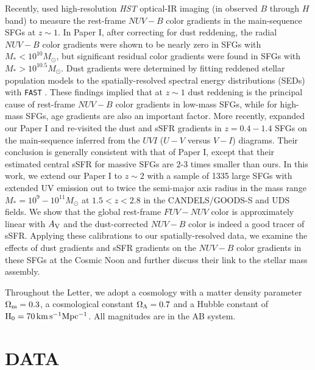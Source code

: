 \documentclass[twocolumn]{aastex61}
\begin{document}
Recently, \citet[][hereafter Paper I]{Liu16} used high-resolution {\it HST} optical-IR 
imaging (in observed $B$ through $H$ band) to measure the rest-frame $NUV-B$ color gradients 
in the main-sequence SFGs at $z\sim1$. In Paper I, after correcting for dust reddening, 
the radial $NUV-B$ color gradients were shown to be nearly zero in SFGs 
with $M_{\ast} < 10^{10}M_{\odot}$, but 
significant residual color gradients were found in SFGs with $M_{\ast} > 10^{10.5}M_{\odot}$. 
Dust gradients were determined by fitting reddened stellar population models to 
the spatially-resolved spectral energy distributions (SEDs) with {\tt FAST} \citep[][]{Kriek+09}.
These findings implied that at $z\sim1$ dust reddening is the principal cause of rest-frame $NUV-B$ 
color gradients in low-mass SFGs, while for high-mass SFGs, 
age gradients are also an important factor. 
More recently, \citet[][]{Wang17} expanded our Paper I and 
re-visited the dust and sSFR gradients in $z=0.4-1.4$ SFGs on the main-sequence 
inferred from the $UVI$ ($U-V$ versus $V-I$) diagrams. Their conclusion is 
generally consistent with that of Paper I, except that their estimated central sSFR for massive SFGs 
are 2-3 times smaller than ours.
%
In this work, we extend our Paper I to $z\sim2$ with a 
sample of 1335 large SFGs with extended UV emission out 
to twice the semi-major axis radius in the mass range $M_{\ast} = 10^{9}-10^{11}M_{\odot}$ 
at $1.5<z<2.8$ in the CANDELS/GOODS-S and UDS fields. 
We show that the global rest-frame $FUV-NUV$ color is approximately linear 
with $A_{\rm V}$ and the dust-corrected $NUV-B$ color is indeed a good 
tracer of sSFR. Applying these calibrations to our spatially-resolved data, 
we examine the effects of dust gradients and sSFR gradients on 
the $NUV-B$ color gradients in these SFGs at the Cosmic Noon 
and further discuss their link to the stellar mass assembly.  

Throughout the Letter, we adopt a cosmology with a matter density 
parameter $\Omega_{\rm m}=0.3$, a cosmological constant 
$\Omega_{\rm \Lambda}=0.7$ and a Hubble constant of ${\rm H}_{\rm 
0}=70\,{\rm km \, s^{-1} Mpc^{-1}}$. All magnitudes are in the AB system.

\section{DATA}
\end{document}
